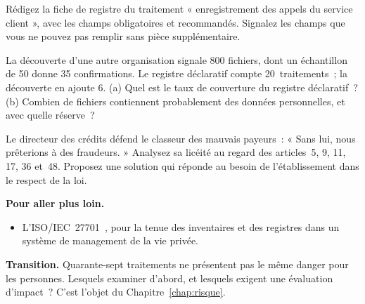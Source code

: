 \begin{boxexo}[title={\ding{45}\quad Exercice~9.2. Une fiche de registre \niveaumoyen}]
Rédigez la fiche de registre du traitement « enregistrement des appels du
service client », avec les champs obligatoires et recommandés. Signalez les
champs que vous ne pouvez pas remplir sans pièce supplémentaire.
\end{boxexo}

\begin{boxexo}[title={\ding{45}\quad Exercice~9.3. Mesurer la complétude \niveaumoyen}]
La découverte d'une autre organisation signale 800 fichiers, dont un
échantillon de 50 donne 35 confirmations. Le registre déclaratif compte
20~traitements~; la découverte en ajoute 6. (a) Quel est le taux de
couverture du registre déclaratif~? (b) Combien de fichiers contiennent
probablement des données personnelles, et avec quelle réserve~?
\end{boxexo}

\begin{boxexo}[title={\ding{45}\quad Exercice~9.4. La liste noire \niveauexpert}]
Le directeur des crédits défend le classeur des mauvais payeurs~: « Sans
lui, nous prêterions à des fraudeurs. » Analysez sa licéité au regard des
articles~5, 9, 11, 17, 36 et~48. Proposez une solution qui réponde au
besoin de l'établissement dans le respect de la loi.
\end{boxexo}

\bigskip

\begin{boxinfo}
\textbf{Pour aller plus loin.}
\begin{itemize}
    \item L'ISO/IEC~27701~\cite{iso27701}, pour la tenue des inventaires et
          des registres dans un système de management de la vie privée.
\end{itemize}
\end{boxinfo}

\begin{boxinfo}
\textbf{Transition.} Quarante-sept traitements ne présentent pas le même
danger pour les personnes. Lesquels examiner d'abord, et lesquels exigent
une évaluation d'impact~? C'est l'objet du Chapitre~\ref{chap:risque}.
\end{boxinfo}
